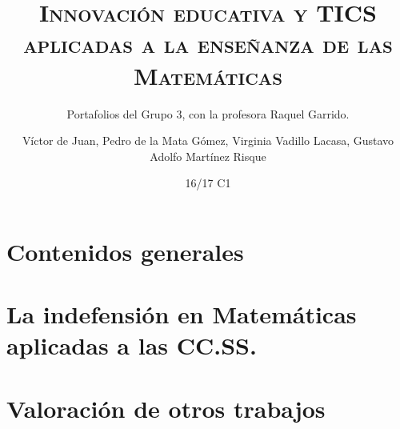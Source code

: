 \documentclass[palatino,nochap,miniheader,nobuilddate]{apuntesURJC}
\title{\textsc{Innovación educativa y TICS aplicadas a la enseñanza de las Matemáticas}}
\subtitle{Portafolios del Grupo 3, con la profesora Raquel Garrido.}
\author{Víctor de Juan,
Pedro de la Mata Gómez,
Virginia Vadillo Lacasa,
Gustavo Adolfo Martínez Risque}
\date{16/17 C1}
\begin{document}
\pagestyle{plain}



\maketitle

\tableofcontents
\newpage

\chapter{Contenidos generales}


\chapter{La indefensión en Matemáticas aplicadas a las CC.SS.}


\chapter{Valoración de otros trabajos}







\printindex
\end{document}
